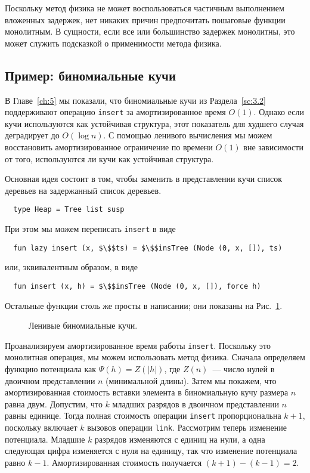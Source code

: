 Поскольку метод физика не может воспользоваться частичным выполнением
вложенных задержек, нет никаких причин предпочитать пошаговые функции
монолитным. В сущности, если все или большинство задержек монолитны,
это может служить подсказкой о применимости метода физика.

\subsection{Пример: биномиальные кучи}
\label{sc:6.4.1}

В Главе~\ref{ch:5} мы показали, что биномиальные кучи из
Раздела~\ref{sc:3.2} поддерживают операцию \lstinline!insert! за
амортизированное время $O(1)$. Однако если кучи используются как
устойчивая структура, этот показатель для худшего случая деградирует
до $O(\log n)$.  С помощью ленивого вычисления мы можем восстановить
амортизированное ограничение по времени $O(1)$ вне зависимости от
того, используются ли кучи как устойчивая структура.

Основная идея состоит в том, чтобы заменить в представлении кучи
список деревьев на задержанный список деревьев.
\begin{lstlisting}
  type Heap = Tree list susp
\end{lstlisting}
При этом мы можем переписать \lstinline!insert! в виде
\begin{lstlisting}
  fun lazy insert (x, $\$$ts) = $\$$insTree (Node (0, x, []), ts)
\end{lstlisting}
или, эквивалентным образом, в виде
\begin{lstlisting}
  fun insert (x, h) = $\$$insTree (Node (0, x, []), force h)
\end{lstlisting}
Остальные функции столь же просты в написании; они показаны на
Рис.~\ref{fig:6.2}.

\begin{figure}
  \centering

  \caption{Ленивые биномиальные кучи.}
  \label{fig:6.2}
\end{figure}

Проанализируем амортизированное время работы
\lstinline!insert!. Поскольку это монолитная операция, мы можем
использовать метод физика. Сначала определяем функцию потенциала как
$\Psi(h) = Z(|h|)$, где $Z(n)$~--- число нулей в двоичном
представлении $n$ (минимальной длины). Затем мы покажем, что
амортизированная стоимость вставки элемента в биномиальную кучу
размера $n$ равна двум.  Допустим, что $k$ младших разрядов в двоичном
представлении $n$ равны единице. Тогда полная стоимость операции
\lstinline!insert! пропорциональна $k + 1$, поскольку включает $k$
вызовов операции \lstinline!link!.  Рассмотрим теперь изменение
потенциала. Младшие $k$ разрядов изменяются с единиц на нули, а одна
следующая цифра изменяется с нуля на единицу, так что изменение
потенциала равно $k - 1$. Амортизированная стоимость получается
$(k + 1)  - (k - 1) = 2$.

